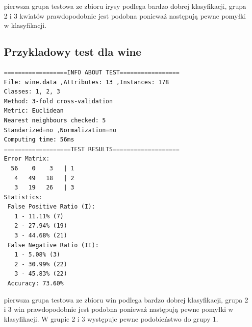 \documentclass{classrep}
\begin{document}
pierwsza grupa testowa ze zbioru irysy podlega bardzo dobrej klasyfikacji, grupa 2 i 3 kwiatów prawdopodobnie jest podobna ponieważ następują pewne pomyłki w klasyfikacji.

\subsection{Przykladowy test dla wine}

\begin{verbatim}
==================INFO ABOUT TEST=================
File: wine.data ,Attributes: 13 ,Instances: 178
Classes: 1, 2, 3
Method: 3-fold cross-validation
Metric: Euclidean
Nearest neighbours checked: 5
Standarized=no ,Normalization=no
Computing time: 56ms
===================TEST RESULTS===================
Error Matrix:
  56    0    3   | 1
   4   49   18   | 2
   3   19   26   | 3
Statistics:
 False Positive Ratio (I):
   1 - 11.11% (7)
   2 - 27.94% (19)
   3 - 44.68% (21)
 False Negative Ratio (II):
   1 - 5.08% (3)
   2 - 30.99% (22)
   3 - 45.83% (22)
 Accuracy: 73.60%
\end{verbatim}

pierwsza grupa testowa ze zbioru win podlega bardzo dobrej klasyfikacji, grupa 2 i 3 win prawdopodobnie jest podobna ponieważ następują pewne pomyłki w klasyfikacji. W grupie 2 i 3 występuje pewne podobieństwo do grupy 1.


\end{document}
